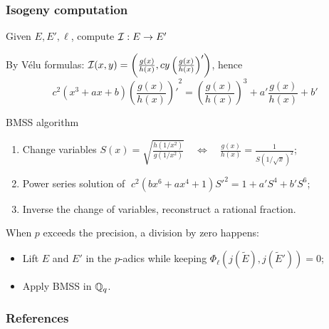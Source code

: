 \documentclass[10pt]{beamer}
\begin{document}
\begin{frame}
  \frametitle{Isogeny computation}
  
  \vspace{-1mm}

  \begin{center}
    \large
    Given $E, E', \ell$, compute $\mathcal{I}:E\to E'$
  \end{center}

  By Vélu formulas:
  $\mathcal{I}(x,y) = \left(\frac{g(x)}{h(x)}, cy\left(\frac{g(x)}{h(x)}\right)'\right)$,
  hence
  \[c^2(x^3 + ax + b){\left(\frac{g(x)}{h(x)}\right)'}^2 =
  \left(\frac{g(x)}{h(x)}\right)^3 + a'\frac{g(x)}{h(x)} + b'\]
  
  \vspace{-1mm}

  \begin{block}{BMSS algorithm \parencite{bostan+morain+salvy+schost08}}
    \begin{enumerate}
    \item Change variables $ S(x) =
      \sqrt{\frac{h(1/x^2)}{g(1/x^2)}} \quad\Leftrightarrow\quad
      \frac{g(x)}{h(x)} = \frac{1}{S(1/\sqrt{x})^2}$;
    \item Power series solution of 
      $\;c^2(bx^6 + ax^4 + 1){S'}^2 = 1 + a'S^4 + b'S^6$;
    \item Inverse the change of variables, reconstruct a rational
      fraction.
    \end{enumerate}
  \end{block}

  \vspace{-1mm}

  \begin{block}{\cite{lercier+sirvent08}}
    When $p$ exceeds the precision, a division by zero happens:
    \begin{itemize}
    \item Lift $E$ and $E'$ in the $p$-adics while keeping $\Phi_\ell\left(j(\tilde{E}),j(\tilde{E}')\right)=0$;
    \item Apply BMSS in $\mathbb{Q}_q$.
    \end{itemize}
  \end{block}
\end{frame}




{
\begin{frame}[allowframebreaks]
  \frametitle{References}


  \beamertemplatebookbibitems
  \printbibliography[filter=books]
  \beamertemplatearticlebibitems
  \printbibliography[filter=articles]
\end{frame}
}
\end{document}
